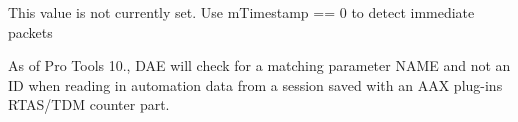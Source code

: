 \begin{DoxyRefList}
\item[Member \mbox{\hyperlink{a01429_ab6fce0aee8fb08695ac8a112b3c3e7fa}{A\+A\+X\+\_\+\+C\+Midi\+Packet::m\+Is\+Immediate}} ]\label{a00786__compatibility_notes000025}%
%
 This value is not currently set. Use {\ttfamily m\+Timestamp == 0} to detect immediate packets  
\item[Member \mbox{\hyperlink{a01537_a37efc08612535de4712bd59445ce8fbf}{A\+A\+X\+\_\+\+C\+Parameter$<$ T $>$::A\+A\+X\+\_\+\+C\+Parameter}} (A\+A\+X\+\_\+\+C\+Param\+ID identifier, const \mbox{\hyperlink{a01873}{A\+A\+X\+\_\+\+I\+String}} \&name, T default\+Value, const A\+A\+X\+\_\+\+I\+Taper\+Delegate$<$ T $>$ \&taper\+Delegate, const A\+A\+X\+\_\+\+I\+Display\+Delegate$<$ T $>$ \&display\+Delegate, bool automatable=false)]\label{a00786__compatibility_notes000026}%
%
 As of Pro Tools 10., D\+AE will check for a matching parameter N\+A\+ME and not an ID when reading in automation data from a session saved with an A\+AX plug-\/ins R\+T\+A\+S/\+T\+DM counter part. 


\end{DoxyRefList}
